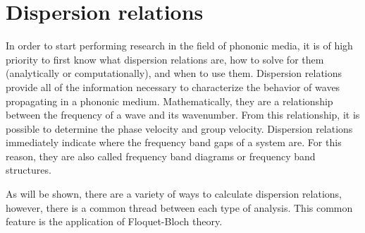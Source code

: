 \documentclass{article}
\begin{document}


\section{Dispersion relations}
In order to start performing research in the field of phononic media, it is of 
high priority to first know what dispersion relations are, how to solve for 
them (analytically or computationally), and when to use them. Dispersion 
relations provide all of the information necessary to characterize 
the behavior of waves propagating in a phononic medium. Mathematically, they 
are a relationship between the frequency of a wave and its wavenumber. From 
this relationship, it is possible to determine the phase velocity and group 
velocity. Dispersion relations immediately indicate where the frequency 
band gaps of a system are. For this reason, they are also called frequency band 
diagrams or frequency band structures.

As will be shown, there are a variety of ways to calculate dispersion 
relations, however, there is a common thread between each type of analysis. 
This common feature is the application of Floquet-Bloch theory.

\end{document}

